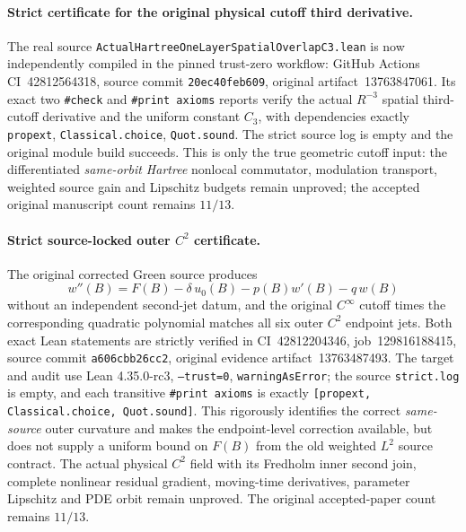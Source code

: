 \documentclass[11pt]{amsart}
\begin{document}
\paragraph{Strict certificate for the original physical cutoff third derivative.}
The real source \texttt{ActualHartreeOneLayerSpatialOverlapC3.lean}
is now independently compiled in the pinned trust-zero workflow:
GitHub Actions CI~42812564318, source commit
\texttt{20ec40feb609}, original artifact~13763847061.
Its exact two \texttt{\#check} and
\texttt{\#print axioms} reports verify the actual
\(R^{-3}\) spatial third-cutoff derivative
and the uniform constant \(C_3\), with dependencies
exactly \texttt{propext}, \texttt{Classical.choice},
\texttt{Quot.sound}. The strict source log is empty
and the original module build succeeds.
This is only the true geometric cutoff input:
the differentiated \emph{same-orbit Hartree}
nonlocal commutator, modulation transport,
weighted source gain and Lipschitz budgets
remain unproved; the accepted original
manuscript count remains \(11/13\).


\paragraph{Strict source-locked outer \(C^2\) certificate.}
The original corrected Green source produces
\[
  w''(B)=F(B)-\delta\,u_0(B)
          -p(B)w'(B)-q\,w(B)
\]
without an independent second-jet datum, and
the original \(C^\infty\) cutoff times the
corresponding quadratic polynomial matches
all six outer \(C^2\) endpoint jets.
Both exact Lean statements are strictly verified
in CI~42812204346, job~129816188415,
source commit \texttt{a606cbb26cc2},
original evidence artifact~13763487493.
The target and audit use Lean 4.35.0-rc3,
\texttt{--trust=0}, \texttt{warningAsError};
the source \texttt{strict.log} is empty,
and each transitive \texttt{\#print axioms}
is exactly \texttt{[propext, Classical.choice, Quot.sound]}.
This rigorously identifies the correct \emph{same-source}
outer curvature and makes the endpoint-level correction
available, but does not supply a uniform bound on
\(F(B)\) from the old weighted \(L^2\) source contract.
The actual physical \(C^2\) field with its Fredholm
inner second join, complete nonlinear residual
gradient, moving-time derivatives, parameter Lipschitz
and PDE orbit remain unproved. The original
accepted-paper count remains \(11/13\).
\end{document}
